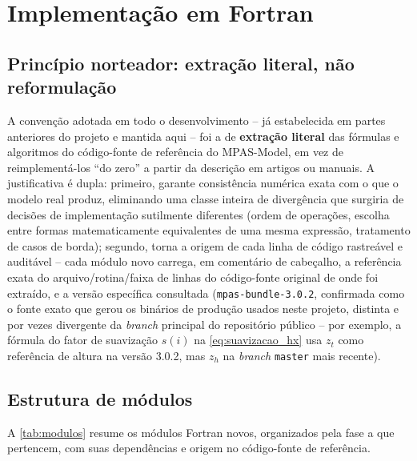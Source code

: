 \chapter{Implementação em Fortran}
\label{cap:implementacao}

\section{Princípio norteador: extração literal, não reformulação}

A convenção adotada em todo o desenvolvimento -- já estabelecida em
partes anteriores do projeto \selfgrib{} e mantida aqui -- foi a de
\textbf{extração literal} das fórmulas e algoritmos do código-fonte de
referência do MPAS-Model, em vez de reimplementá-los ``do zero'' a partir
da descrição em artigos ou manuais. A justificativa é dupla: primeiro,
garante consistência numérica exata com o que o modelo real produz,
eliminando uma classe inteira de divergência que surgiria de decisões de
implementação sutilmente diferentes (ordem de operações, escolha entre
formas matematicamente equivalentes de uma mesma expressão, tratamento de
casos de borda); segundo, torna a origem de cada linha de código
rastreável e auditável -- cada módulo novo carrega, em comentário de
cabeçalho, a referência exata do arquivo/rotina/faixa de linhas do
código-fonte original de onde foi extraído, e a versão específica
consultada (\texttt{mpas-bundle-3.0.2}, confirmada como o fonte exato que
gerou os binários de produção usados neste projeto, distinta e por vezes
divergente da \emph{branch} principal do repositório público -- por
exemplo, a fórmula do fator de suavização $s(i)$ na
\cref{eq:suavizacao_hx} usa $z_t$ como referência de altura na versão
3.0.2, mas $z_h$ na \emph{branch} \texttt{master} mais recente).

\section{Estrutura de módulos}

A \cref{tab:modulos} resume os módulos Fortran novos, organizados pela
fase a que pertencem, com suas dependências e origem no código-fonte de
referência.

